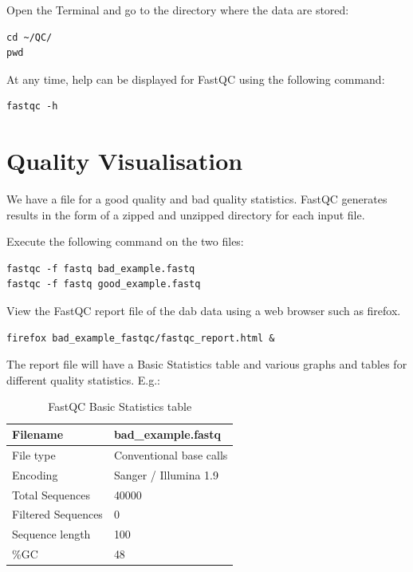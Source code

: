 \begin{steps}
Open the Terminal and go to the directory where the data are stored:
\begin{lstlisting}
cd ~/QC/
pwd
\end{lstlisting}

At any time, help can be displayed for FastQC using the following command:
\begin{lstlisting}
fastqc -h
\end{lstlisting}

\end{steps}


\section{Quality Visualisation}

\begin{information}
We have a file for a good quality and bad quality statistics. FastQC generates
results in the form of a zipped and unzipped directory for each input file.
\end{information}

\begin{steps}
Execute the following command on the two files:
\begin{lstlisting}
fastqc -f fastq bad_example.fastq 
fastqc -f fastq good_example.fastq
\end{lstlisting}

View the FastQC report file of the dab data using a web browser such as
firefox.

\begin{lstlisting}
firefox bad_example_fastqc/fastqc_report.html &
\end{lstlisting}

\end{steps}

\begin{note}
The report file will have a Basic Statistics table and various graphs and tables
for different quality statistics. E.g.:
\end{note}

\begin{table}[H]
  \centering
  \caption{FastQC Basic Statistics table}
    \begin{tabular}{ll}
    \toprule
    Filename & bad\_example.fastq \\
    \midrule
    File type & Conventional base calls \\
    Encoding & Sanger / Illumina 1.9 \\
    Total Sequences & 40000 \\
    Filtered Sequences & 0 \\
    Sequence length & 100 \\
    \%GC  & 48 \\
    \bottomrule
    \end{tabular}%
  \label{tab:badexampleuntrimmed}%
\end{table}%

